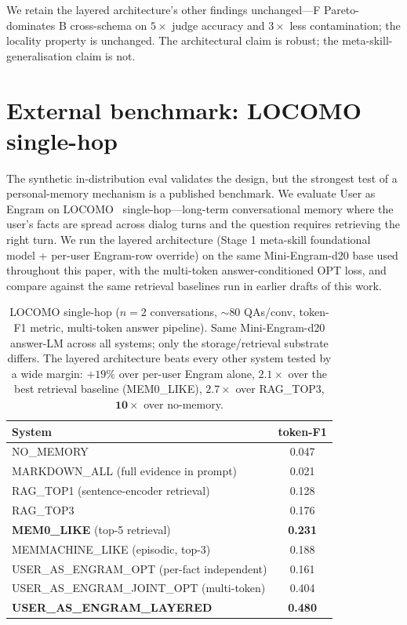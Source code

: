 \documentclass{article}
\begin{document}
We retain the layered architecture's other findings unchanged—F
Pareto-dominates B cross-schema on $5{\times}$ judge accuracy and
$3{\times}$ less contamination; the locality property is unchanged.
The architectural claim is robust; the meta-skill-generalisation
claim is not.


\section{External benchmark: LOCOMO single-hop}
\label{sec:locomo}

The synthetic in-distribution eval validates the design, but the
strongest test of a personal-memory mechanism is a published
benchmark. We evaluate User as Engram on
LOCOMO~\citep{maharana2024locomo} single-hop—long-term conversational
memory where the user's facts are spread across dialog turns and the
question requires retrieving the right turn. We run the layered
architecture (Stage 1 meta-skill foundational model + per-user
Engram-row override) on the same Mini-Engram-d20 base used throughout
this paper, with the multi-token answer-conditioned OPT loss, and
compare against the same retrieval baselines run in earlier drafts
of this work.

\begin{table}[t]
  \centering
  \caption{LOCOMO single-hop ($n{=}2$ conversations, $\sim$80
  QAs/conv, token-F1 metric, multi-token answer pipeline). Same
  Mini-Engram-d20 answer-LM across all systems; only the
  storage/retrieval substrate differs. The layered architecture
  beats every other system tested by a wide margin: $+19\%$ over
  per-user Engram alone, $\mathbf{2.1{\times}}$ over the best
  retrieval baseline (MEM0\_LIKE), $\mathbf{2.7{\times}}$ over
  RAG\_TOP3, $\mathbf{10{\times}}$ over no-memory.}
  \label{tab:locomo}
  \begin{tabular}{lc}
    \toprule
    System & token-F1 \\
    \midrule
    NO\_MEMORY                        & 0.047 \\
    MARKDOWN\_ALL (full evidence in prompt) & 0.021 \\
    RAG\_TOP1 (sentence-encoder retrieval)  & 0.128 \\
    RAG\_TOP3                         & 0.176 \\
    \textbf{MEM0\_LIKE} (top-5 retrieval)   & \textbf{0.231} \\
    MEMMACHINE\_LIKE (episodic, top-3)& 0.188 \\
    USER\_AS\_ENGRAM\_OPT (per-fact independent) & 0.161 \\
    USER\_AS\_ENGRAM\_JOINT\_OPT (multi-token)   & 0.404 \\
    \textbf{USER\_AS\_ENGRAM\_LAYERED}   & \textbf{0.480} \\
    \bottomrule
  \end{tabular}
\end{table}
\end{document}
